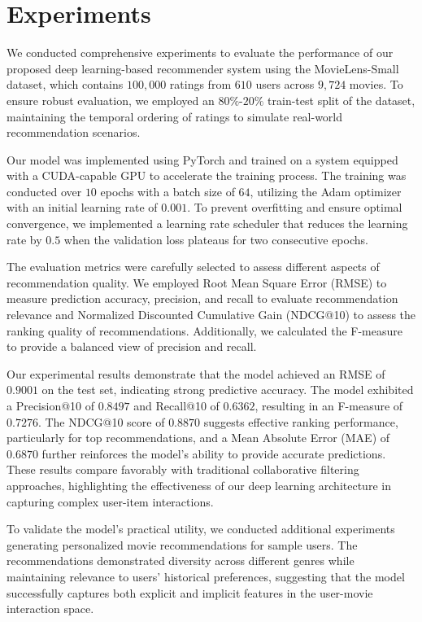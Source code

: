 \documentclass[sigconf]{acmart}
\begin{document}
\section{Experiments}\label{sec:experiments}
We conducted comprehensive experiments to evaluate the performance of our proposed deep learning-based recommender system using the MovieLens-Small dataset, which contains $100,000$ ratings from $610$ users across $9,724$ movies. To ensure robust evaluation, we employed an $80\%$-$20\%$ train-test split of the dataset, maintaining the temporal ordering of ratings to simulate real-world recommendation scenarios.

Our model was implemented using PyTorch and trained on a system equipped with a CUDA-capable GPU to accelerate the training process. The training was conducted over $10$ epochs with a batch size of $64$, utilizing the Adam optimizer with an initial learning rate of $0.001$. To prevent overfitting and ensure optimal convergence, we implemented a learning rate scheduler that reduces the learning rate by $0.5$ when the validation loss plateaus for two consecutive epochs.

The evaluation metrics were carefully selected to assess different aspects of recommendation quality. We employed Root Mean Square Error (RMSE) to measure prediction accuracy, precision, and recall to evaluate recommendation relevance and Normalized Discounted Cumulative Gain (NDCG@10) to assess the ranking quality of recommendations. Additionally, we calculated the F-measure to provide a balanced view of precision and recall.

Our experimental results demonstrate that the model achieved an RMSE of $0.9001$ on the test set, indicating strong predictive accuracy. The model exhibited a Precision@10 of $0.8497$ and Recall@10 of $0.6362$, resulting in an F-measure of $0.7276$. The NDCG@10 score of $0.8870$ suggests effective ranking performance, particularly for top recommendations, and a Mean Absolute Error (MAE) of $0.6870$ further reinforces the model's ability to provide accurate predictions. These results compare favorably with traditional collaborative filtering approaches, highlighting the effectiveness of our deep learning architecture in capturing complex user-item interactions.

To validate the model's practical utility, we conducted additional experiments generating personalized movie recommendations for sample users. The recommendations demonstrated diversity across different genres while maintaining relevance to users' historical preferences, suggesting that the model successfully captures both explicit and implicit features in the user-movie interaction space.
\end{document}
